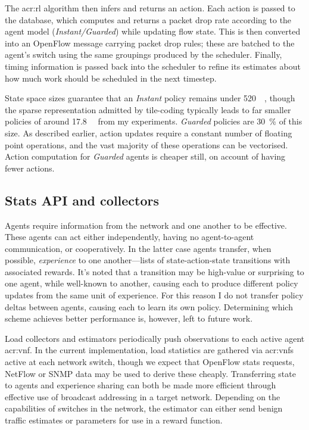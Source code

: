 The \gls{acr:rl} algorithm then infers and returns an action.
Each action is passed to the database, which computes and returns a packet drop rate according to the agent model (\emph{Instant/Guarded}) while updating flow state.
This is then converted into an OpenFlow message carrying packet drop rules; these are batched to the agent's switch using the same groupings produced by the scheduler.
Finally, timing information is passed back into the scheduler to refine its estimates about how much work should be scheduled in the next timestep.

State space sizes guarantee that an \emph{Instant} policy remains under \qty{520}{\kibi\byte}, though the sparse representation admitted by tile-coding typically leads to far smaller policies of around \qty{17.8}{\kibi\byte} from my experiments.
\emph{Guarded} policies are \qty{30}{\percent} of this size.
As described earlier, action updates require a constant number of floating point operations, and the vast majority of these operations can be vectorised.
Action computation for \emph{Guarded} agents is cheaper still, on account of having fewer actions.

\subsection{Stats API and collectors}
Agents require information from the network and one another to be effective.
These agents can act either independently, having no agent-to-agent communication, or cooperatively.
In the latter case agents transfer, when possible, \emph{experience} to one another---lists of state-action-state transitions with associated rewards.
It's noted that a transition may be high-value or surprising to one agent, while well-known to another, causing each to produce different policy updates from the same unit of experience.
For this reason I do not transfer policy deltas between agents, causing each to learn its own policy.
Determining which scheme achieves better performance is, however, left to future work.

Load collectors and estimators periodically push observations to each active agent \gls{acr:vnf}.
In the current implementation, load statistics are gathered via \glspl{acr:vnf} active at each network switch, though we expect that OpenFlow stats requests, NetFlow or SNMP data may be used to derive these cheaply.
Transferring state to agents and experience sharing can both be made more efficient through effective use of broadcast addressing in a target network.
Depending on the capabilities of switches in the network, the estimator can either send benign traffic estimates or parameters for use in a reward function.

